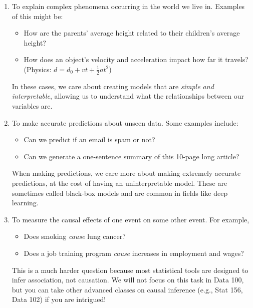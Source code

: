 \documentclass[
  letterpaper,
  DIV=11,
  numbers=noendperiod]{scrreprt}
\providecommand{\tightlist}{%
  \setlength{\itemsep}{0pt}\setlength{\parskip}{0pt}}\usepackage{longtable,booktabs,array}
\begin{document}
\begin{enumerate}
\def\labelenumi{\arabic{enumi}.}
\item
  To explain complex phenomena occurring in the world we live in.
  Examples of this might be:

  \begin{itemize}
  \tightlist
  \item
    How are the parents' average height related to their children's
    average height?
  \item
    How does an object's velocity and acceleration impact how far it
    travels? (Physics: \(d = d_0 + vt + \frac{1}{2}at^2\))
  \end{itemize}

  In these cases, we care about creating models that are \emph{simple
  and interpretable}, allowing us to understand what the relationships
  between our variables are.
\item
  To make accurate predictions about unseen data. Some examples include:

  \begin{itemize}
  \tightlist
  \item
    Can we predict if an email is spam or not?
  \item
    Can we generate a one-sentence summary of this 10-page long article?
  \end{itemize}

  When making predictions, we care more about making extremely accurate
  predictions, at the cost of having an uninterpretable model. These are
  sometimes called black-box models and are common in fields like deep
  learning.
\item
  To measure the causal effects of one event on some other event. For
  example,

  \begin{itemize}
  \tightlist
  \item
    Does smoking \emph{cause} lung cancer?
  \item
    Does a job training program \emph{cause} increases in employment and
    wages?
  \end{itemize}

  This is a much harder question because most statistical tools are
  designed to infer association, not causation. We will not focus on
  this task in Data 100, but you can take other advanced classes on
  causal inference (e.g., Stat 156, Data 102) if you are intrigued!
\end{enumerate}
\end{document}
